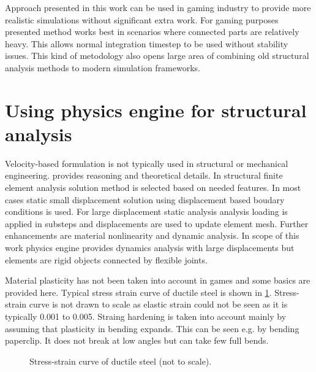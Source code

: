 Approach presented in this work can be used in gaming industry to provide more realistic 
simulations without significant extra work. For gaming purposes presented method works 
best in scenarios where connected parts are relatively heavy. This allows normal 
integration timestep to be used without stability issues. 
This kind of metodology also opens large area of combining old structural analysis
methods to modern simulation frameworks.

\section{Using physics engine for structural analysis}

Velocity-based formulation is not typically used in structural or mechanical engineering.
 \cite[p.~45]{erleben.thesis} provides reasoning and theoretical details. 
In structural finite element analysis solution method is selected based on needed features.
In most cases static small displacement solution using displacement based boudary conditions is used.
For large displacement static analysis analysis loading is applied in substeps and 
displacements are used to update element mesh.
Further enhancements are material nonlinearity and dynamic analysis.
In scope of this work physics engine provides dynamics analysis 
with large displacements but elements are rigid objects connected by flexible joints.

Material plasticity has not been taken into account in games and some basics are provided here.
Typical stress strain curve of ductile steel is shown in \ref{fig:areas}.
Stress-strain curve is not drawn to scale as elastic strain could not be seen as it is typically 0.001 to 0.005.
Straing hardening is taken into account mainly by assuming that plasticity in bending expands.
This can be seen e.g. by bending paperclip. It does not break at low angles but can take few full bends. 

\begin{figure}[htb!]
\centering
{}
\caption{Stress-strain curve of ductile steel (not to scale).}
\label{fig:areas}
\end{figure}

